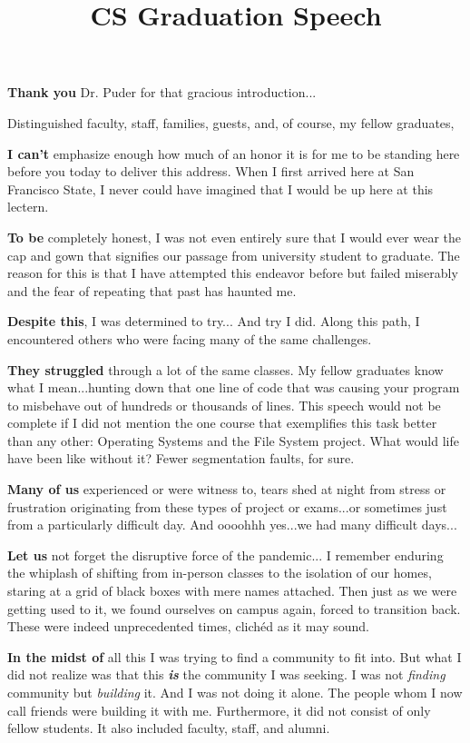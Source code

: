 \documentclass[12pt]{article}
\title{CS Graduation Speech}
\begin{document}
\textbf{Thank you} Dr. Puder for that gracious introduction...

Distinguished faculty, staff, families, guests, and, of course, my fellow graduates,


\textbf{I can't} emphasize enough how much of an honor it is for me to be standing here
before you today to deliver this address.  When I first arrived here at San
Francisco State, I never could have imagined that I would be up here at this lectern.

\textbf{To be} completely honest, I was not even entirely sure that I would ever
wear the cap and gown that signifies our passage from university student to graduate.
The reason for this is that I have attempted this endeavor before but failed
miserably and the fear of repeating that past has haunted me.

\textbf{Despite this}, I was determined to try... And try I did.  Along this path, I
encountered others who were facing many of the same challenges.

\textbf{They struggled} through a lot of the same classes. My fellow graduates know
what I mean...hunting down that one line of code that was causing your program to
misbehave out of hundreds or thousands of lines.  This speech would not be
complete if I did not mention the one course that exemplifies this task
better than any other: Operating Systems and
the File System project.  What would life have been like without it?  Fewer
segmentation faults, for sure.

\textbf{Many of us} experienced or were witness to, tears shed at night from
stress or frustration originating from these types of project or exams...or sometimes just from a
particularly difficult day.  And oooohhh yes...we had many difficult days... 

\textbf{Let us} not forget the disruptive force of the pandemic... I remember enduring the
whiplash of shifting from in-person classes to the isolation of our
homes, staring at a grid of black boxes with mere names attached.  Then just as
we were getting used to it, we found ourselves on campus again, forced to
transition back.  These were indeed unprecedented times, clichéd as it may sound.

\textbf{In the midst of} all this I was trying to find a community to fit into.
But what I did not realize was that this \emph{\textbf{is}} the
community I was seeking.  I was not \emph{finding} community but \emph{building} it.  And
I was not doing it alone.  The people whom I now call friends were building it with
me.  Furthermore, it did not consist of only fellow students.  It also included
faculty, staff, and alumni.
\end{document}
